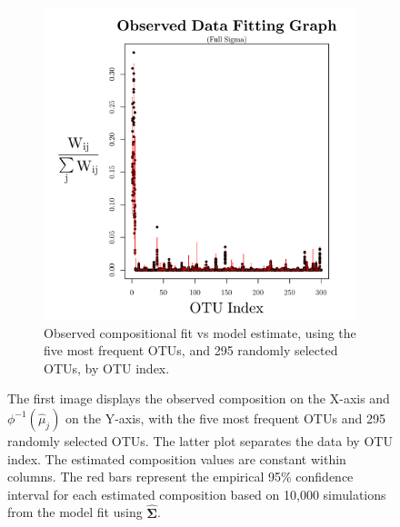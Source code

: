\documentclass{template}
\begin{document}
\begin{figure}[ht!]
\begin{subfigure}[b]{0.34\textheight}
        \includegraphics[width=\textwidth]{Images/XiaPlotBars295v5T.pdf}
        \caption{Observed compositional fit vs model estimate, using the five most frequent OTUs, and 295 randomly selected OTUs, by OTU index.}
    \end{subfigure}
    \caption{The first image displays the observed composition on the X-axis and $\phi^{-1}(\hat{\mu}_j)$ on the Y-axis, with the five most frequent OTUs and 295 randomly selected OTUs. The latter plot separates the data by OTU index. The estimated composition values are constant within columns. The red bars represent the empirical 95\% confidence interval for each estimated composition based on 10,000 simulations from the model fit using $\hat{\boldsymbol{\Sigma}}$.}\label{fig:compFitBar295}
\end{figure}

\clearpage 
\end{document}
